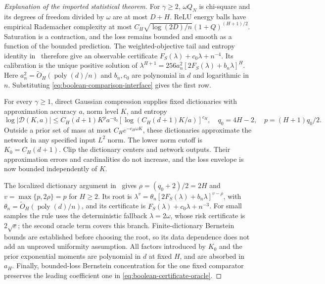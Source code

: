 \begin{proof}[Explanation of the imported statistical theorem]
For $\gamma\ge2$, $\omega Q_N$ is chi-square and its degrees of freedom divided by $\omega$ are at most $D+H$. ReLU energy balls have empirical Rademacher complexity at most
$C_H\sqrt{\log(2D)/n}(1+Q)^{(H+1)/2}$. Saturation is a contraction, and the loss remains bounded and smooth as a function of the bounded prediction. The weighted-objective tail and entropy identity in~\cite{adaptive} therefore give an observable certificate $F_S(\lambda)+c_0\lambda+n^{-4}$. Its calibration is the unique positive solution of
$\lambda^{H+1}=256a_n^2[2F_S(\lambda)+b_n\lambda]^H$.
Here $a_n^2=\widetilde O_H(\operatorname{poly}(d)/n)$ and $b_n,c_0$ are polynomial in $d$ and logarithmic in $n$. Substituting \eqref{eq:boolean-comparison-interface} gives the first row.

For every $\gamma\ge1$, direct Gaussian compression supplies fixed dictionaries with approximation accuracy $a$, norm level $K$, and entropy
\[
 \log|\mathcal D(K,a)|\le C_H(d+1)K^{p}a^{-q_0}
       [\log(C_H(d+1)K/a)]^{c_H},
 \quad q_0=4H-2,\quad p=(H+1)q_0/2.
\]
Outside a prior set of mass at most $C_He^{-c_H\omega K}$, these dictionaries approximate the network in any specified input $L^2$ norm. The lower norm cutoff is $K_0=C_H(d+1)$. Clip the dictionary centers and network outputs. Their approximation errors and cardinalities do not increase, and the loss envelope is now bounded independently of $K$.

The localized dictionary argument in~\cite{localized} gives
$\rho=(q_0+2)/2=2H$ and $v=\max\{p,2\rho\}=p$ for $H\ge2$.
Its root is
$\lambda^v=\theta_n[2F_S(\lambda)+b_n\lambda]^{v-\rho}$,
with $\theta_n=\widetilde O_H(\operatorname{poly}(d)/n)$, and its certificate is $F_S(\lambda)+c_0\lambda+n^{-3}$. For small samples the rule uses the deterministic fallback $\lambda=2\omega$, whose risk certificate is $2\sqrt e$; the second oracle term covers this branch. Finite-dictionary Bernstein bounds are established before choosing the root, so its data dependence does not add an unproved uniformity assumption. All factors introduced by $K_0$ and the prior exponential moments are polynomial in $d$ at fixed $H$, and are absorbed in $a_H$. Finally, bounded-loss Bernstein concentration for the one fixed comparator preserves the leading coefficient one in \eqref{eq:boolean-certificate-oracle}.
\end{proof}

